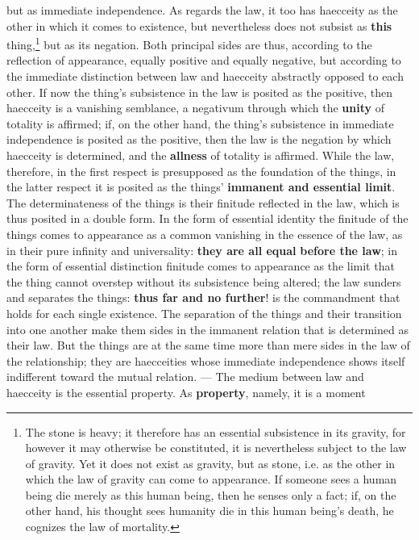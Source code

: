 \documentclass[12pt,a4paper,openany]{book}
\newcommand{\opage}[1]{\marginnote{\footnotesize\textit{[#1]}}}
\begin{document}
\opage{185}but as immediate independence. As regards
the law, it too has haecceity
as the other in which it comes to existence,
but nevertheless does not subsist as \textbf{this} thing,\footnote{The stone is heavy; it therefore has an essential subsistence in its gravity, for however it may otherwise be constituted, it is nevertheless subject to the law of gravity. Yet it does not exist as gravity, but as stone, i.e. as the other in which the law of gravity can come to appearance. If someone sees a human being die merely as this human being, then he senses only a fact; if, on the other hand, his thought sees humanity die in this human being's death, he cognizes the law of mortality.} but
as its negation. Both principal sides are thus,
according to the reflection of appearance, equally positive and
equally negative, but according to the immediate distinction
between law and haecceity abstractly opposed to each other.
If now the thing's subsistence in the law is posited as
the positive, then haecceity is a vanishing
semblance, a negativum through which the \textbf{unity} of totality
is affirmed; if, on the other hand, the thing's subsistence in
immediate independence is posited as the
positive, then the law is the negation by which haecceity
is determined, and the \textbf{allness} of totality is affirmed.
While the law, therefore, in the first respect is
presupposed as the foundation of the things, in the
latter respect it is posited as the things' \textbf{immanent
and essential limit}. The determinateness of the things
is their finitude reflected in the law, which is
thus posited in a double form. In the form
of essential identity the finitude of the things comes
to appearance as a common vanishing in the essence of the law,
as in their pure infinity and
\setcounter{footnote}{0}%
\opage{186}universality: \textbf{they are all equal} \textbf{before the law}; in the form
of essential distinction finitude comes to appearance
as the limit that the thing cannot overstep without
its subsistence being altered; the law sunders and separates
the things: \textbf{thus far and no further}! is the
commandment that holds for each single existence. The separation
of the things and their transition into one another make them
sides in the immanent relation that is determined
as their law. But the things are at the same time more than
mere sides in the law of the relationship; they are haecceities whose immediate independence shows itself indifferent
toward the mutual relation. --- The medium
between law and haecceity is the essential property.
As \textbf{property}, namely, it is a moment
\end{document}
